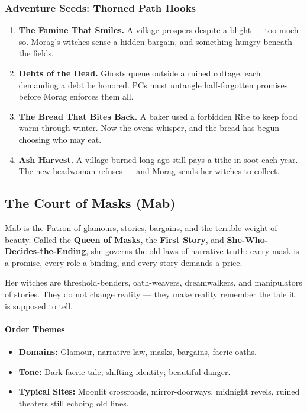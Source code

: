 \documentclass[11pt]{book}
\begin{document}
\subsubsection{Adventure Seeds: Thorned Path Hooks}

\begin{enumerate}[leftmargin=*]
    \item \textbf{The Famine That Smiles.} A village prospers despite a blight --- too much so. Morag's witches sense a hidden bargain, and something hungry beneath the fields.
    \item \textbf{Debts of the Dead.} Ghosts queue outside a ruined cottage, each demanding a debt be honored. PCs must untangle half-forgotten promises before Morag enforces them all.
    \item \textbf{The Bread That Bites Back.} A baker used a forbidden Rite to keep food warm through winter. Now the ovens whisper, and the bread has begun choosing who may eat.
    \item \textbf{Ash Harvest.} A village burned long ago still pays a tithe in soot each year. The new headwoman refuses --- and Morag sends her witches to collect.
\end{enumerate}

\subsection{The Court of Masks (Mab)}

Mab is the Patron of glamours, stories, bargains, and the terrible weight of beauty.  
Called the \textbf{Queen of Masks}, the \textbf{First Story}, and \textbf{She-Who-Decides-the-Ending}, she governs the old laws of narrative truth: every mask is a promise, every role a binding, and every story demands a price.

Her witches are threshold-benders, oath-weavers, dreamwalkers, and manipulators of stories. They do not change reality --- they make reality remember the tale it is supposed to tell.

\paragraph{Order Themes}
\begin{itemize}[leftmargin=*]
    \item \textbf{Domains:} Glamour, narrative law, masks, bargains, faerie oaths.
    \item \textbf{Tone:} Dark faerie tale; shifting identity; beautiful danger.
    \item \textbf{Typical Sites:} Moonlit crossroads, mirror-doorways, midnight revels, ruined theaters still echoing old lines.
\end{itemize}
\end{document}
